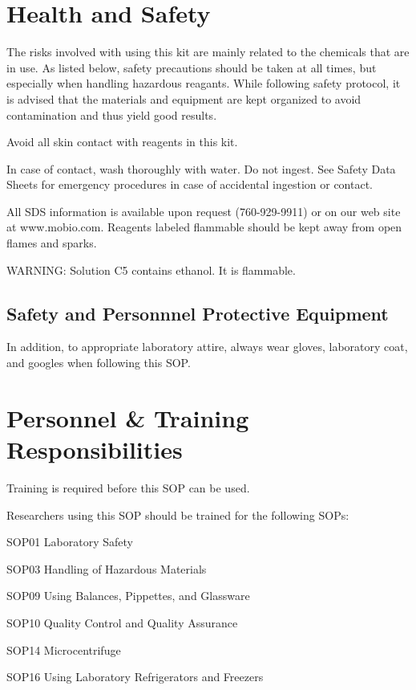 \documentclass[12pt]{../SOP4_alpha}\usepackage[]{graphicx}\usepackage[]{xcolor}
\begin{document}
\section{Health and Safety}

\NP The risks involved with using this kit are mainly related to the chemicals that are in use. As listed below, safety precautions should be taken at all times, but especially when handling hazardous reagants. While following safety protocol, it is advised that the materials and equipment are kept organized to avoid contamination and thus yield good results. 

\NP Avoid all skin contact with reagents in this kit. 

\NP In case of contact, wash thoroughly with water. Do not
ingest. See Safety Data Sheets for emergency procedures in case
of accidental ingestion or contact. 

\NP All SDS information is available upon request (760-929-9911) or on our web site at www.mobio.com. Reagents labeled flammable should be kept away from open flames and sparks.

\NP WARNING: Solution C5 contains ethanol. It is flammable. 
 
\subsection {Safety and Personnnel Protective Equipment}

\NP In addition, to appropriate laboratory attire, always wear gloves, laboratory coat, and googles when following this SOP.

\section{Personnel \& Training Responsibilities}

\NP Training is required before this SOP can be used. 

\NP Researchers using this SOP should be trained for the following SOPs:

\begin{itemize*}
  \item SOP01 Laboratory Safety
  \item SOP03 Handling of Hazardous Materials
  \item SOP09 Using Balances, Pippettes, and Glassware
  \item SOP10 Quality Control and Quality Assurance
  \item SOP14 Microcentrifuge
  \item SOP16 Using Laboratory Refrigerators and Freezers
\end{itemize*}
\end{document}

